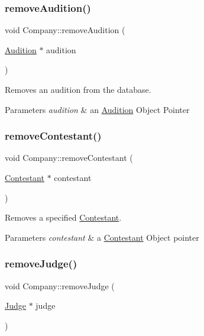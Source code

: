 \subsubsection{\texorpdfstring{remove\+Audition()}{removeAudition()}}
{\footnotesize\ttfamily void Company\+::remove\+Audition (\begin{DoxyParamCaption}\item[{\hyperlink{class_audition}{Audition} $\ast$}]{audition }\end{DoxyParamCaption})}



Removes an audition from the database. 


\begin{DoxyParams}{Parameters}
{\em audition} & an \hyperlink{class_audition}{Audition} Object Pointer \\
\hline
\end{DoxyParams}
\mbox{\label{class_company_acccfc131326fef9d641bdab101d0cb9e}} 
\subsubsection{\texorpdfstring{remove\+Contestant()}{removeContestant()}}
{\footnotesize\ttfamily void Company\+::remove\+Contestant (\begin{DoxyParamCaption}\item[{\hyperlink{class_contestant}{Contestant} $\ast$}]{contestant }\end{DoxyParamCaption})}



Removes a specified \hyperlink{class_contestant}{Contestant}. 


\begin{DoxyParams}{Parameters}
{\em contestant} & a \hyperlink{class_contestant}{Contestant} Object pointer \\
\hline
\end{DoxyParams}
\mbox{\label{class_company_a39346c8e12c0cdcd47e300089301a6ea}} 
\subsubsection{\texorpdfstring{remove\+Judge()}{removeJudge()}}
{\footnotesize\ttfamily void Company\+::remove\+Judge (\begin{DoxyParamCaption}\item[{\hyperlink{class_judge}{Judge} $\ast$}]{judge }\end{DoxyParamCaption})}



